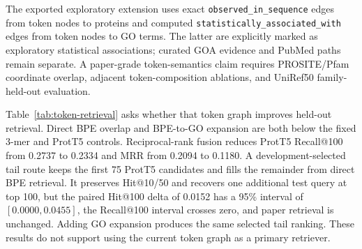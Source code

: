 \documentclass[11pt]{article}
\begin{document}
\begin{table}[h]
\centering
\caption{Exploratory parent-level protein token--GO association controls. Significant pairs use BH-FDR $q\leq0.05$ and at least three supporting proteins. The null permutes complete GO label sets within protein-length strata.}
\label{tab:token-semantics}
\end{table}

The exported exploratory extension uses exact \texttt{observed\_in\_sequence} edges from token nodes to proteins and computed \texttt{statistically\_associated\_with} edges from token nodes to GO terms. The latter are explicitly marked as exploratory statistical associations; curated GOA evidence and PubMed paths remain separate. A paper-grade token-semantics claim requires PROSITE/Pfam coordinate overlap, adjacent token-composition ablations, and UniRef50 family-held-out evaluation.

Table~\ref{tab:token-retrieval} asks whether that token graph improves held-out retrieval. Direct BPE overlap and BPE-to-GO expansion are both below the fixed 3-mer and ProtT5 controls. Reciprocal-rank fusion reduces ProtT5 Recall@100 from 0.2737 to 0.2334 and MRR from 0.2094 to 0.1180. A development-selected tail route keeps the first 75 ProtT5 candidates and fills the remainder from direct BPE retrieval. It preserves Hit@10/50 and recovers one additional test query at top 100, but the paired Hit@100 delta of 0.0152 has a 95\% interval of $[0.0000,0.0455]$, the Recall@100 interval crosses zero, and paper retrieval is unchanged. Adding GO expansion produces the same selected tail ranking. These results do not support using the current token graph as a primary retriever.
\end{document}
